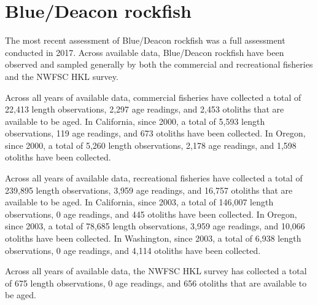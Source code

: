 \documentclass[11pt,
  english,
  letterpaper,
]{article}
\begin{document}

\hypertarget{bluedeacon-rockfish}{%
\section{Blue/Deacon rockfish}\label{bluedeacon-rockfish}}

\leavevmode\tagmcend\tagstructend


The most recent assessment of Blue/Deacon rockfish was a full assessment conducted in 2017. Across available data, Blue/Deacon rockfish have been observed and sampled generally by both the commercial and recreational fisheries and the NWFSC HKL survey.

\leavevmode\tagmcend\tagstructend\par


Across all years of available data, commercial fisheries have collected a total of 22,413 length observations, 2,297 age readings, and 2,453 otoliths that are available to be aged. In California, since 2000, a total of 5,593 length observations, 119 age readings, and 673 otoliths have been collected. In Oregon, since 2000, a total of 5,260 length observations, 2,178 age readings, and 1,598 otoliths have been collected.

\leavevmode\tagmcend\tagstructend\par


Across all years of available data, recreational fisheries have collected a total of 239,895 length observations, 3,959 age readings, and 16,757 otoliths that are available to be aged. In California, since 2003, a total of 146,007 length observations, 0 age readings, and 445 otoliths have been collected. In Oregon, since 2003, a total of 78,685 length observations, 3,959 age readings, and 10,066 otoliths have been collected. In Washington, since 2003, a total of 6,938 length observations, 0 age readings, and 4,114 otoliths have been collected.

\leavevmode\tagmcend\tagstructend\par


Across all years of available data, the NWFSC HKL survey has collected a total of 675 length observations, 0 age readings, and 656 otoliths that are available to be aged.
\end{document}
